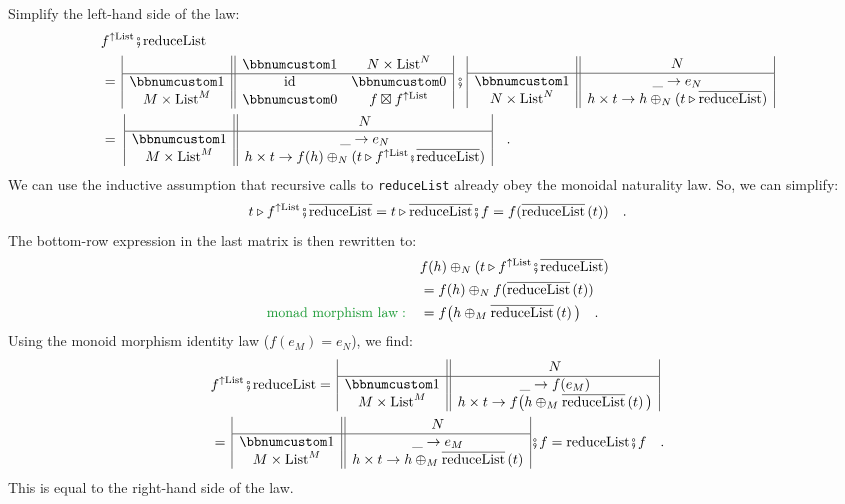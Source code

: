 Simplify the left-hand side of the law:
\begin{align*}
 & f^{\uparrow\text{List}}\bef\text{reduceList}\\
 & =\,\begin{array}{|c||cc|}
 & \bbnum 1 & N\times\text{List}^{N}\\
\hline \bbnum 1 & \text{id} & \bbnum 0\\
M\times\text{List}^{M} & \bbnum 0 & f\boxtimes f^{\uparrow\text{List}}
\end{array}\,\bef\,\begin{array}{|c||c|}
 & N\\
\hline \bbnum 1 & \_\rightarrow e_{N}\\
N\times\text{List}^{N} & h\times t\rightarrow h\oplus_{N}(t\triangleright\overline{\text{reduceList}})
\end{array}\\
 & =\,\,\begin{array}{|c||c|}
 & N\\
\hline \bbnum 1 & \_\rightarrow e_{N}\\
M\times\text{List}^{M} & h\times t\rightarrow f(h)\oplus_{N}(t\triangleright f^{\uparrow\text{List}}\bef\overline{\text{reduceList}})
\end{array}\quad.
\end{align*}
We can use the inductive assumption that recursive calls to \lstinline!reduceList!
already obey the monoidal naturality law. So, we can simplify:
\[
t\triangleright f^{\uparrow\text{List}}\bef\overline{\text{reduceList}}=t\triangleright\overline{\text{reduceList}}\bef f=f(\overline{\text{reduceList}}\left(t\right))\quad.
\]
The bottom-row expression in the last matrix is then rewritten to:
\begin{align*}
 & f(h)\oplus_{N}(t\triangleright f^{\uparrow\text{List}}\bef\overline{\text{reduceList}})\\
 & =f(h)\oplus_{N}f(\overline{\text{reduceList}}\left(t\right))\\
{\color{greenunder}\text{monad morphism law}:}\quad & =f\big(h\oplus_{M}\overline{\text{reduceList}}\left(t\right)\big)\quad.
\end{align*}
Using the monoid morphism identity law ($f(e_{M})=e_{N}$), we find:
\begin{align*}
 & f^{\uparrow\text{List}}\bef\text{reduceList}=\,\begin{array}{|c||c|}
 & N\\
\hline \bbnum 1 & \_\rightarrow f(e_{M})\\
M\times\text{List}^{M} & h\times t\rightarrow f\big(h\oplus_{M}\overline{\text{reduceList}}\left(t\right)\big)
\end{array}\\
 & =\,\begin{array}{|c||c|}
 & N\\
\hline \bbnum 1 & \_\rightarrow e_{M}\\
M\times\text{List}^{M} & h\times t\rightarrow h\oplus_{M}\overline{\text{reduceList}}\left(t\right)
\end{array}\bef f=\text{reduceList}\bef f\quad.
\end{align*}
 This is equal to the right-hand side of the law.

